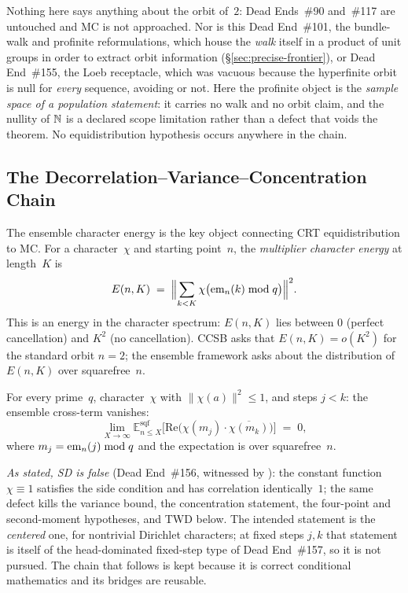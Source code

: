 \begin{remark}
\smallskip
Nothing here says anything about the orbit of~$2$: Dead Ends~\#90
and~\#117 are untouched and MC is not approached.  Nor is this Dead
End~\#101, the bundle-walk and profinite reformulations, which house the
\emph{walk} itself in a product of unit groups in order to extract orbit
information (\S\ref{sec:precise-frontier}), or Dead End~\#155, the Loeb
receptacle, which was vacuous because the hyperfinite orbit is null for
\emph{every} sequence, avoiding or not.  Here the profinite object is the
\emph{sample space of a population statement}: it carries no walk and no
orbit claim, and the nullity of $\mathbb{N}$ is a declared scope limitation
rather than a defect that voids the theorem.  No equidistribution
hypothesis occurs anywhere in the chain.
\end{remark}

\subsection{The Decorrelation--Variance--Concentration Chain}
\label{sec:decorr-chain}

The ensemble character energy is the key object connecting CRT
equidistribution to MC\@.  For a character~$\chi$ and starting
point~$n$, the \emph{multiplier character energy} at length~$K$ is
\[
  E(n, K) \;=\; \Bigl\|\sum_{k < K} \chi\bigl(\mathrm{em}_{n}(k) \bmod q\bigr)\Bigr\|^2.
\]
This is an energy in the character spectrum: $E(n, K)$ lies between $0$
(perfect cancellation) and $K^2$ (no cancellation).  CCSB asks that
$E(n, K) = o(K^2)$ for the standard orbit $n = 2$; the ensemble
framework asks about the distribution of $E(n, K)$ over squarefree~$n$.

\begin{property}
For every prime~$q$, character~$\chi$ with $\|\chi(a)\|^2 \leq 1$, and
steps $j < k$: the ensemble cross-term vanishes:
\[
  \lim_{X \to \infty}
  \mathbb{E}_{n \leq X}^{\mathrm{sqf}}
  \bigl[\mathrm{Re}\bigl(\chi(m_j) \cdot \overline{\chi(m_k)}\bigr)\bigr]
  \;=\; 0,
\]
where $m_j = \mathrm{em}_{n}(j) \bmod q$ and the expectation is
over squarefree~$n$.
\end{property}

\noindent\emph{As stated, SD is false} (Dead End~\#156, witnessed by
):
the constant function $\chi \equiv 1$ satisfies the side condition and
has correlation identically~$1$; the same defect kills the variance
bound, the concentration statement, the four-point and second-moment
hypotheses, and TWD below.  The intended statement is the
\emph{centered} one, for nontrivial Dirichlet characters; at fixed steps
$j,k$ that statement is itself of the head-dominated fixed-step type of
Dead End~\#157, so it is not pursued.  The chain that follows is kept
because it is correct conditional mathematics and its bridges are
reusable.

